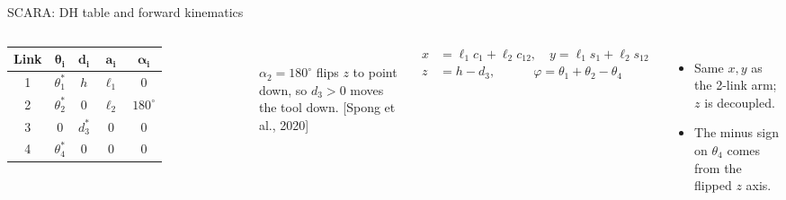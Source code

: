 \documentclass[aspectratio=169,10pt]{beamer}
\begin{document}
\begin{frame}[t]{SCARA: DH table and forward kinematics}
\begin{columns}[T,onlytextwidth]
\centering
\small
\begin{tabular}{@{}c c c c c@{}}
\toprule
\textbf{Link} & $\bm{\theta_i}$ & $\bm{d_i}$ & $\bm{a_i}$ & $\bm{\alpha_i}$\\
\midrule
1 & $\theta_1^{*}$ & $h$ & $\ell_1$ & $0$\\
2 & $\theta_2^{*}$ & $0$ & $\ell_2$ & $180^\circ$\\
3 & $0$ & $d_3^{*}$ & $0$ & $0$\\
4 & $\theta_4^{*}$ & $0$ & $0$ & $0$\\
\bottomrule
\end{tabular}\\[1mm]
{\scriptsize $\alpha_2=180^\circ$ flips $z$ to point down, so $d_3>0$ moves the tool down. [Spong et al., 2020]}
\begin{eqbox}
\vspace{-2mm}
\[
\begin{aligned}
x&=\ell_1c_1+\ell_2c_{12}, \quad y=\ell_1s_1+\ell_2s_{12}\\
z&=h-d_3,\qquad\quad \varphi=\theta_1+\theta_2-\theta_4
\end{aligned}
\]
\vspace{-4mm}
\end{eqbox}
\begin{itemize}\small
\item Same $x,y$ as the 2-link arm; $z$ is decoupled.
\item The minus sign on $\theta_4$ comes from the flipped $z$ axis.
\end{itemize}
\end{columns}
\end{frame}
\end{document}

